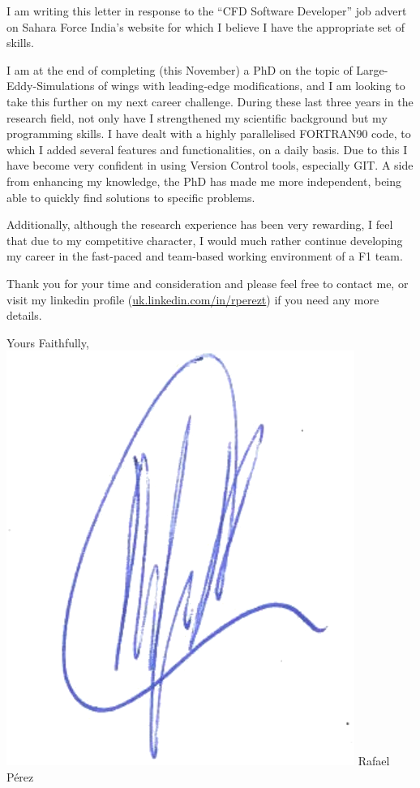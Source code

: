 \documentclass[10pt,stdletter,dateno,sigleft]{newlfm} %
\begin{document}
\begin{newlfm}


I am writing this letter in response to the ``CFD Software Developer'' job advert on Sahara Force
India's website for which I believe I have the appropriate set of skills. 

I am at the end of completing (this November) a PhD on the topic of Large-Eddy-Simulations
of wings with leading-edge modifications, and I am looking to take this further on my next
career challenge. During these last three years in the research field, not only have I
strengthened my scientific background but my programming skills. I have dealt with a
highly parallelised FORTRAN90 code, to which I added several features and functionalities,
on a daily basis. Due to this I have become very confident in using Version Control tools,
especially GIT. A side from enhancing my knowledge, the PhD has made me more
independent, being able to quickly find solutions to specific problems. 

Additionally, although the research experience has been very rewarding, I feel that due to
my competitive character, I would much rather continue developing my career in the
fast-paced and team-based working environment of a F1 team.

Thank you for your time and consideration and please feel free to contact me, or visit my
linkedin profile (\href{https://uk.linkedin.com/in/rperezt}{uk.linkedin.com/in/rperezt})
if you need any more details.

Yours Faithfully, \newline %
\includegraphics[scale=0.6]{sgtrBlue} \newline 
Rafael P\'erez


\end{newlfm}
\end{document}
